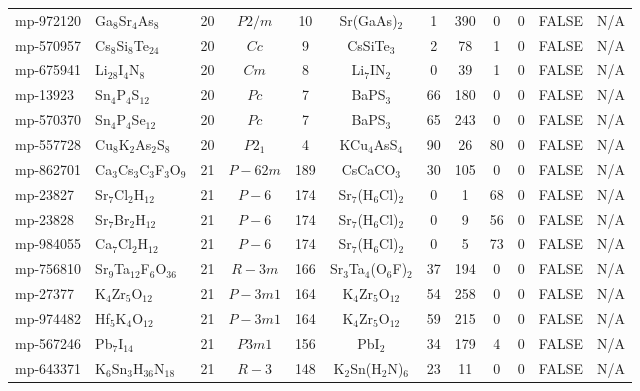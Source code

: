 {\begin{longtable}{llcccccccccc}
    mp-972120 & Ga$_{8}$Sr$_{4}$As$_{8}$ & 20    & $P2/m$ & 10    & Sr(GaAs)$_{2}$ & 1     & 390   & 0     & 0     & FALSE & N/A \\
    mp-570957 & Cs$_{8}$Si$_{8}$Te$_{24}$ & 20    & $Cc$  & 9     & CsSiTe$_{3}$ & 2     & 78    & 1     & 0     & FALSE & N/A \\
    mp-675941 & Li$_{28}$I$_{4}$N$_{8}$ & 20    & $Cm$  & 8     & Li$_{7}$IN$_{2}$ & 0     & 39    & 1     & 0     & FALSE & N/A \\
    mp-13923 & Sn$_{4}$P$_{4}$S$_{12}$ & 20    & $Pc$  & 7     & BaPS$_{3}$ & 66    & 180   & 0     & 0     & FALSE & N/A \\
    mp-570370 & Sn$_{4}$P$_{4}$Se$_{12}$ & 20    & $Pc$  & 7     & BaPS$_{3}$ & 65    & 243   & 0     & 0     & FALSE & N/A \\
    mp-557728 & Cu$_{8}$K$_{2}$As$_{2}$S$_{8}$ & 20    & $P2_1$ & 4     & KCu$_{4}$AsS$_{4}$ & 90    & 26    & 80    & 0     & FALSE & N/A \\
    mp-862701 & Ca$_{3}$Cs$_{3}$C$_{3}$F$_{3}$O$_{9}$ & 21    & $P-62m$ & 189   & CsCaCO$_{3}$ & 30    & 105   & 0     & 0     & FALSE & N/A \\
    mp-23827 & Sr$_{7}$Cl$_{2}$H$_{12}$ & 21    & $P-6$ & 174   & Sr$_{7}$(H$_{6}$Cl)$_{2}$ & 0     & 1     & 68    & 0     & FALSE & N/A \\
    mp-23828 & Sr$_{7}$Br$_{2}$H$_{12}$ & 21    & $P-6$ & 174   & Sr$_{7}$(H$_{6}$Cl)$_{2}$ & 0     & 9     & 56    & 0     & FALSE & N/A \\
    mp-984055 & Ca$_{7}$Cl$_{2}$H$_{12}$ & 21    & $P-6$ & 174   & Sr$_{7}$(H$_{6}$Cl)$_{2}$ & 0     & 5     & 73    & 0     & FALSE & N/A \\
    mp-756810 & Sr$_{9}$Ta$_{12}$F$_{6}$O$_{36}$ & 21    & $R-3m$ & 166   & Sr$_{3}$Ta$_{4}$(O$_{6}$F)$_{2}$ & 37    & 194   & 0     & 0     & FALSE & N/A \\
    mp-27377 & K$_{4}$Zr$_{5}$O$_{12}$ & 21    & $P-3m1$ & 164   & K$_{4}$Zr$_{5}$O$_{12}$ & 54    & 258   & 0     & 0     & FALSE & N/A \\
    mp-974482 & Hf$_{5}$K$_{4}$O$_{12}$ & 21    & $P-3m1$ & 164   & K$_{4}$Zr$_{5}$O$_{12}$ & 59    & 215   & 0     & 0     & FALSE & N/A \\
    mp-567246 & Pb$_{7}$I$_{14}$ & 21    & $P3m1$ & 156   & PbI$_{2}$ & 34    & 179   & 4     & 0     & FALSE & N/A \\
    mp-643371 & K$_{6}$Sn$_{3}$H$_{36}$N$_{18}$ & 21    & $R-3$ & 148   & K$_{2}$Sn(H$_{2}$N)$_{6}$ & 23    & 11    & 0     & 0     & FALSE & N/A \\

\end{longtable}}
